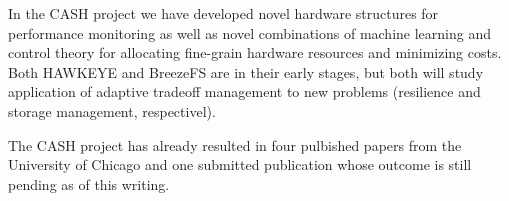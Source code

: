  In the CASH project we have
developed novel hardware structures for performance monitoring as well
as novel combinations of machine learning and control theory for
allocating fine-grain hardware resources and minimizing costs.  Both
HAWKEYE and BreezeFS are in their early stages, but both will study
application of adaptive tradeoff management to new problems
(resilience and storage management, respectivel).  

 The CASH project has already resulted
in four pulbished papers from the University of Chicago
\cite{kim-cpsna,POET,FSE2015,JouleGuard} and one submitted publication
whose outcome is still pending as of this writing.